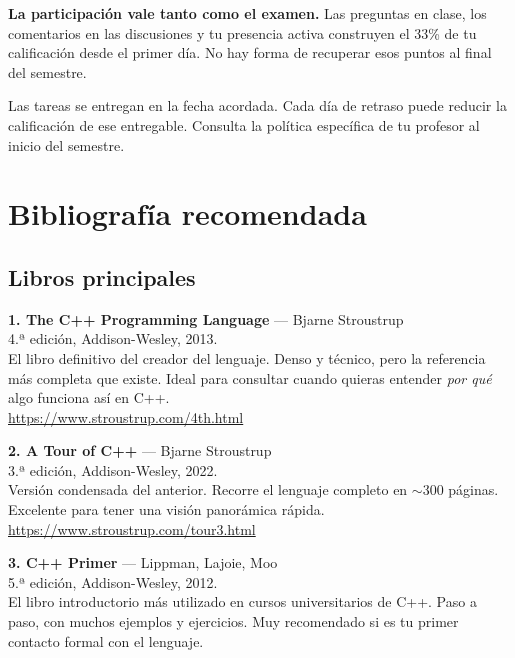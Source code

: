 \documentclass[12pt, oneside]{article}
\begin{document}
\begin{consejo}
  \textbf{La participación vale tanto como el examen.} Las preguntas en clase,
  los comentarios en las discusiones y tu presencia activa construyen el 33\%
  de tu calificación desde el primer día. No hay forma de recuperar esos puntos
  al final del semestre.
\end{consejo}

\begin{advertencia}
  Las tareas se entregan en la fecha acordada. Cada día de retraso puede
  reducir la calificación de ese entregable. Consulta la política específica
  de tu profesor al inicio del semestre.
\end{advertencia}

\section{Bibliografía recomendada}

\subsection{Libros principales}

\textbf{1. The C++ Programming Language} — Bjarne Stroustrup\\
4.ª edición, Addison-Wesley, 2013.\\
El libro definitivo del creador del lenguaje. Denso y técnico, pero
la referencia más completa que existe. Ideal para consultar cuando quieras
entender \textit{por qué} algo funciona así en C++.\\
\url{https://www.stroustrup.com/4th.html}

\vspace{0.8em}
\textbf{2. A Tour of C++} — Bjarne Stroustrup\\
3.ª edición, Addison-Wesley, 2022.\\
Versión condensada del anterior. Recorre el lenguaje completo en $\sim$300
páginas. Excelente para tener una visión panorámica rápida.\\
\url{https://www.stroustrup.com/tour3.html}

\vspace{0.8em}
\textbf{3. C++ Primer} — Lippman, Lajoie, Moo\\
5.ª edición, Addison-Wesley, 2012.\\
El libro introductorio más utilizado en cursos universitarios de C++.
Paso a paso, con muchos ejemplos y ejercicios. Muy recomendado si es tu
primer contacto formal con el lenguaje.
\end{document}
